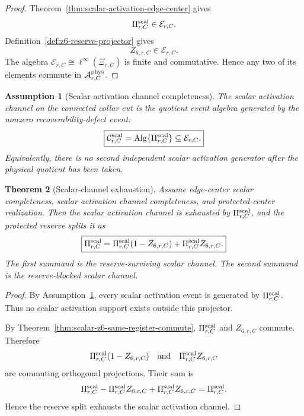 \documentclass[11pt]{article}
\newtheorem{theorem}{Theorem}[section]
\newtheorem{assumption}[theorem]{Assumption}
\theoremstyle{remark}
\theoremstyle{plain}
\begin{document}
\begin{proof}
Theorem~\ref{thm:scalar-activation-edge-center} gives
\[
\Pi^{\rm scal}_{r,C}\in\mathcal E_{r,C}.
\]
Definition~\ref{def:z6-reserve-projector} gives
\[
Z_{6,r,C}\in\mathcal E_{r,C}.
\]
The algebra \(\mathcal E_{r,C}\cong\ell^\infty(\Xi_{r,C})\) is finite and
commutative. Hence any two of its elements commute in
\(\mathcal A^{\rm phys}_{r,C}\).
\end{proof}

\begin{assumption}[Scalar activation channel completeness]
\label{ass:scalar-activation-channel-completeness}
The scalar activation channel on the connected collar cut is the quotient event
algebra generated by the nonzero recoverability-defect event:
\[
\boxed{
\mathcal C^{\rm scal}_{r,C}
=
\operatorname{Alg}\{\Pi^{\rm scal}_{r,C}\}
\subseteq
\mathcal E_{r,C}.
}
\]
Equivalently, there is no second independent scalar activation generator after
the physical quotient has been taken.
\end{assumption}

\begin{theorem}[Scalar-channel exhaustion]
\label{thm:scalar-channel-exhaustion}
Assume edge-center scalar completeness, scalar activation channel completeness,
and protected-center realization. Then the scalar activation channel is
exhausted by \(\Pi^{\rm scal}_{r,C}\), and the protected reserve splits it as
\[
\boxed{
\Pi^{\rm scal}_{r,C}
=
\Pi^{\rm scal}_{r,C}(1-Z_{6,r,C})
+
\Pi^{\rm scal}_{r,C}Z_{6,r,C}.
}
\]
The first summand is the reserve-surviving scalar channel. The second summand
is the reserve-blocked scalar channel.
\end{theorem}

\begin{proof}
By Assumption~\ref{ass:scalar-activation-channel-completeness}, every scalar
activation event is generated by \(\Pi^{\rm scal}_{r,C}\). Thus no scalar
activation support exists outside this projector.

By Theorem~\ref{thm:scalar-z6-same-register-commute},
\(\Pi^{\rm scal}_{r,C}\) and \(Z_{6,r,C}\) commute. Therefore
\[
\Pi^{\rm scal}_{r,C}(1-Z_{6,r,C})
\quad\text{and}\quad
\Pi^{\rm scal}_{r,C}Z_{6,r,C}
\]
are commuting orthogonal projections. Their sum is
\[
\Pi^{\rm scal}_{r,C}
-
\Pi^{\rm scal}_{r,C}Z_{6,r,C}
+
\Pi^{\rm scal}_{r,C}Z_{6,r,C}
=
\Pi^{\rm scal}_{r,C}.
\]
Hence the reserve split exhausts the scalar activation channel.
\end{proof}
\end{document}
